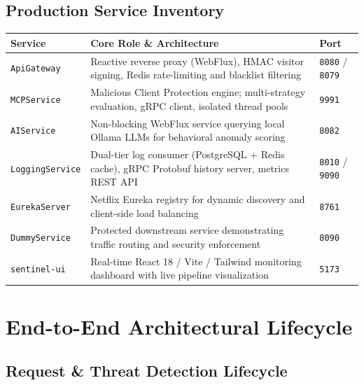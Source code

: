 \documentclass[12pt, a4paper]{article}
\newcommand{\service}[1]{\texttt{\color{accentteal}#1}}
\begin{document}
\subsection{Production Service Inventory}

\begin{center}
\begin{tabular}{L{3.2cm} L{6.8cm} C{2.2cm}}
\toprule
{}
\textbf{Service} & \textbf{Core Role \& Architecture} & \textbf{Port} \\
\midrule
\service{ApiGateway}      & Reactive reverse proxy (WebFlux), HMAC visitor signing, Redis rate-limiting and blacklist filtering & \texttt{8080} / \texttt{8079} \\
\service{MCPService}      & Malicious Client Protection engine; multi-strategy evaluation, gRPC client, isolated thread pools & \texttt{9991} \\
\service{AIService}       & Non-blocking WebFlux service querying local Ollama LLMs for behavioral anomaly scoring & \texttt{8082} \\
\service{LoggingService}  & Dual-tier log consumer (PostgreSQL + Redis cache), gRPC Protobuf history server, metrics REST API & \texttt{8010} / \texttt{9090} \\
\service{EurekaServer}    & Netflix Eureka registry for dynamic discovery and client-side load balancing & \texttt{8761} \\
\service{DummyService}    & Protected downstream service demonstrating traffic routing and security enforcement & \texttt{8090} \\
\service{sentinel-ui}     & Real-time React 18 / Vite / Tailwind monitoring dashboard with live pipeline visualization & \texttt{5173} \\
\bottomrule
\end{tabular}
\end{center}

\newpage
\section{End-to-End Architectural Lifecycle}

\subsection{Request \& Threat Detection Lifecycle}
\end{document}
